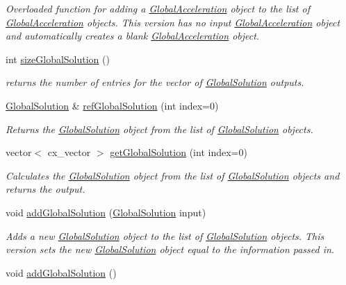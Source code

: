 \begin{DoxyCompactItemize}
\begin{DoxyCompactList}\small\item\em Overloaded function for adding a \hyperlink{class_global_acceleration}{Global\-Acceleration} object to the list of \hyperlink{class_global_acceleration}{Global\-Acceleration} objects. This version has no input \hyperlink{class_global_acceleration}{Global\-Acceleration} object and automatically creates a blank \hyperlink{class_global_acceleration}{Global\-Acceleration} object. \end{DoxyCompactList}\item 
int \hyperlink{class_outputs_body_abe9227589bf83ee0ff40251e6e0d8d27}{size\-Global\-Solution} ()
\begin{DoxyCompactList}\small\item\em returns the number of entries for the vector of \hyperlink{class_global_solution}{Global\-Solution} outputs. \end{DoxyCompactList}\item 
\hyperlink{class_global_solution}{Global\-Solution} \& \hyperlink{class_outputs_body_a7480b88e4d67c84a2c540127c93a15d2}{ref\-Global\-Solution} (int index=0)
\begin{DoxyCompactList}\small\item\em Returns the \hyperlink{class_global_solution}{Global\-Solution} object from the list of \hyperlink{class_global_solution}{Global\-Solution} objects. \end{DoxyCompactList}\item 
vector$<$ cx\-\_\-vector $>$ \hyperlink{class_outputs_body_a0f669819a398d64524a4aff29e20aa8b}{get\-Global\-Solution} (int index=0)
\begin{DoxyCompactList}\small\item\em Calculates the \hyperlink{class_global_solution}{Global\-Solution} object from the list of \hyperlink{class_global_solution}{Global\-Solution} objects and returns the output. \end{DoxyCompactList}\item 
void \hyperlink{class_outputs_body_a75283b4dd4533851008431eb84341919}{add\-Global\-Solution} (\hyperlink{class_global_solution}{Global\-Solution} input)
\begin{DoxyCompactList}\small\item\em Adds a new \hyperlink{class_global_solution}{Global\-Solution} object to the list of \hyperlink{class_global_solution}{Global\-Solution} objects. This version sets the new \hyperlink{class_global_solution}{Global\-Solution} object equal to the information passed in. \end{DoxyCompactList}\item 
\hypertarget{class_outputs_body_a13ae87153fcf43774b970aad94f0ca27}{void \hyperlink{class_outputs_body_a13ae87153fcf43774b970aad94f0ca27}{add\-Global\-Solution} ()}\label{class_outputs_body_a13ae87153fcf43774b970aad94f0ca27}


\end{DoxyCompactItemize}
